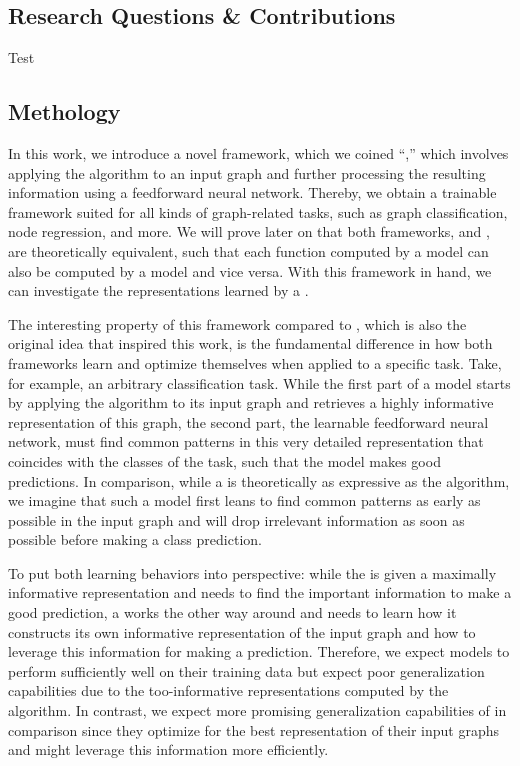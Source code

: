 \subsection{Research Questions \& Contributions}
Test

\subsection{Methology}
In this work, we introduce a novel framework, which we coined ``\wlnn,'' which involves applying the \wl algorithm to an input graph and further processing the resulting information using a feedforward neural network. Thereby, we obtain a trainable framework suited for all kinds of graph-related tasks, such as graph classification, node regression, and more. We will prove later on that both frameworks, \wlnn and \gnn, are theoretically equivalent, such that each function computed by a \wlnn model can also be computed by a \gnn model and vice versa. With this framework in hand, we can investigate the representations learned by a \gnn.

The interesting property of this framework compared to \gnns, which is also the original idea that inspired this work, is the fundamental difference in how both frameworks learn and optimize themselves when applied to a specific task. Take, for example, an arbitrary classification task. While the first part of a \wlnn model starts by applying the \wl algorithm to its input graph and retrieves a highly informative representation of this graph, the second part, the learnable feedforward neural network, must find common patterns in this very detailed representation that coincides with the classes of the task, such that the model makes good predictions. In comparison, while a \gnn is theoretically as expressive as the \wl algorithm, we imagine that such a model first leans to find common patterns as early as possible in the input graph and will drop irrelevant information as soon as possible before making a class prediction. 

To put both learning behaviors into perspective: while the \wlnn is given a maximally informative representation and needs to find the important information to make a good prediction, a \gnn works the other way around and needs to learn how it constructs its own informative representation of the input graph and how to leverage this information for making a prediction. Therefore, we expect \wlnn models to perform sufficiently well on their training data but expect poor generalization capabilities due to the too-informative representations computed by the \wl algorithm. In contrast, we expect more promising generalization capabilities of \gnns in comparison since they optimize for the best representation of their input graphs and might leverage this information more efficiently. 

